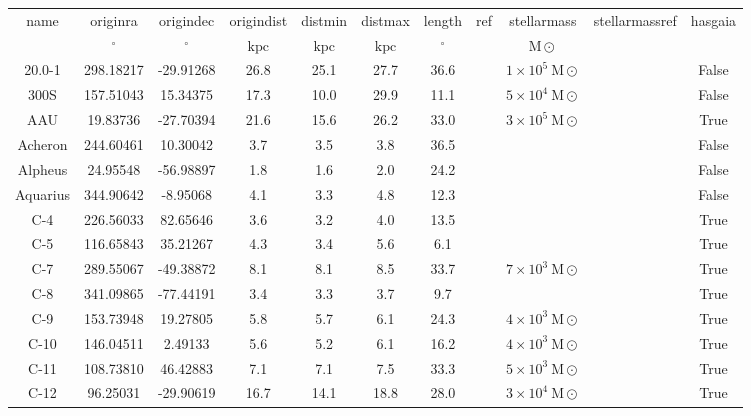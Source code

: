 \begin{table}
\begin{tabular}{ccccccccccc}
name & originra & origindec & origindist & distmin & distmax & length & ref & stellarmass & stellarmassref & hasgaia \\
 & $\mathrm{{}^{\circ}}$ & $\mathrm{{}^{\circ}}$ & $\mathrm{kpc}$ & $\mathrm{kpc}$ & $\mathrm{kpc}$ & $\mathrm{{}^{\circ}}$ &  & $\mathrm{M{\odot}}$ &  &  \\
20.0-1 & 298.18217 & -29.91268 & 26.8 & 25.1 & 27.7 & 36.6 & \citet{mateu:2018} & $1 \times 10^{5}~\mathrm{M}\odot$ & \citet{mateu:2018} & False \\
300S & 157.51043 & 15.34375 & 17.3 & 10.0 & 29.9 & 11.1 & \citet{fu:2018} & $5 \times 10^{4}~\mathrm{M}\odot$ & \citet{usman:2024} & False \\
AAU & 19.83736 & -27.70394 & 21.6 & 15.6 & 26.2 & 33.0 & \citet{li:2021} & $3 \times 10^{5}~\mathrm{M}\odot$ & \citet{shipp:2018} & True \\
Acheron & 244.60461 & 10.30042 & 3.7 & 3.5 & 3.8 & 36.5 & \citet{grillmair:2009} & &  & False \\
Alpheus & 24.95548 & -56.98897 & 1.8 & 1.6 & 2.0 & 24.2 & \citet{grillmair:2013} & &  & False \\
Aquarius & 344.90642 & -8.95068 & 4.1 & 3.3 & 4.8 & 12.3 & \citet{williams:2011} & &  & False \\
C-4 & 226.56033 & 82.65646 & 3.6 & 3.2 & 4.0 & 13.5 & \citet{ibata:2021} & &  & True \\
C-5 & 116.65843 & 35.21267 & 4.3 & 3.4 & 5.6 & 6.1 & \citet{ibata:2021} & &  & True \\
C-7 & 289.55067 & -49.38872 & 8.1 & 8.1 & 8.5 & 33.7 & \citet{ibata:2023} & $7 \times 10^{3}~\mathrm{M}\odot$ &  & True \\
C-8 & 341.09865 & -77.44191 & 3.4 & 3.3 & 3.7 & 9.7 & \citet{ibata:2021} & &  & True \\
C-9 & 153.73948 & 19.27805 & 5.8 & 5.7 & 6.1 & 24.3 & \citet{ibata:2023} & $4 \times 10^{3}~\mathrm{M}\odot$ &  & True \\
C-10 & 146.04511 & 2.49133 & 5.6 & 5.2 & 6.1 & 16.2 & \citet{ibata:2023} & $4 \times 10^{3}~\mathrm{M}\odot$ &  & True \\
C-11 & 108.73810 & 46.42883 & 7.1 & 7.1 & 7.5 & 33.3 & \citet{ibata:2023} & $5 \times 10^{3}~\mathrm{M}\odot$ &  & True \\
C-12 & 96.25031 & -29.90619 & 16.7 & 14.1 & 18.8 & 28.0 & \citet{ibata:2023} & $3 \times 10^{4}~\mathrm{M}\odot$ &  & True \\

\end{tabular}
\end{table}
